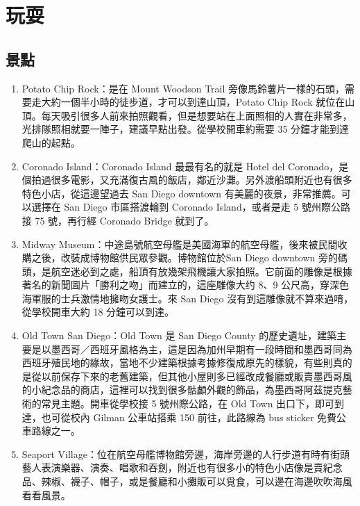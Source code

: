 \documentclass[10pt,a4paper]{book}
\begin{document}
\begin{CJK}{UTF8}{bkai}
\begin{enumerate}
\end{enumerate}

\section{玩耍}
\subsection{景點} 

\begin{enumerate}
\item Potato Chip Rock：是在 Mount Woodson Trail 旁像馬鈴薯片一樣的石頭，需要走大約一個半小時的徒步道，才可以到達山頂，Potato Chip Rock 就位在山頂。每天吸引很多人前來拍照觀看，但是想要站在上面照相的人實在非常多，光排隊照相就要一陣子，建議早點出發。從學校開車約需要 35 分鐘才能到達爬山的起點。

\item Coronado Island：Coronado Island 最最有名的就是 Hotel del Coronado，是個拍過很多電影，又充滿復古風的飯店，鄰近沙灘。另外渡船頭附近也有很多特色小店，從這邊望過去 San Diego downtown 有美麗的夜景，非常推薦。可以選擇在 San Diego 市區搭渡輪到 Coronado Island，或者是走 5 號州際公路接 75 號，再行經 Coronado Bridge 就到了。

\item Midway Museum：中途島號航空母艦是美國海軍的航空母艦，後來被民間收購之後，改裝成博物館供民眾參觀。博物館位於San Diego downtown 旁的碼頭，是航空迷必到之處，船頂有放幾架飛機讓大家拍照。它前面的雕像是根據著名的新聞圖片「勝利之吻」而建立的，這座雕像大约 8、9 公尺高，穿深色海軍服的士兵激情地擁吻女護士。來 San Diego 沒有到這雕像就不算來過唷，從學校開車大約 18 分鐘可以到達。

\item Old Town San Diego：Old Town 是 San Diego County 的歷史遺址，建築主要是以墨西哥／西班牙風格為主，這是因為加州早期有一段時間和墨西哥同為西班牙殖民地的緣故，當地不少建築根據考據修復成原先的樣貌，有些則真的是從以前保存下來的老舊建築，但其他小屋則多已經改成餐廳或販賣墨西哥風的小紀念品的商店，這裡可以找到很多骷顱外觀的飾品，為墨西哥阿茲提克藝術的常見主題。開車從學校接 5 號州際公路，在 Old Town 出口下，即可到達，也可從校內 Gilman 公車站搭乘 150 前往，此路線為 bus sticker 免費公車路線之一。


\item Seaport Village：位在航空母艦博物館旁邊，海岸旁邊的人行步道有時有街頭藝人表演樂器、演奏、唱歌和吞劍，附近也有很多小的特色小店像是賣紀念品、辣椒、襪子、帽子，或是餐廳和小攤販可以覓食，可以邊在海邊吹吹海風看看風景。


\end{enumerate}
\end{CJK}
\end{document}
